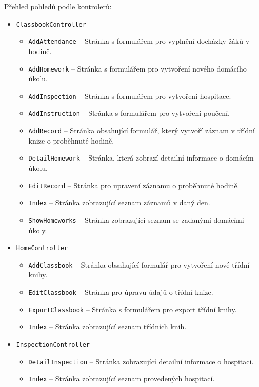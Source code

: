 Přehled pohledů podle kontrolerů:

\begin{itemize}
    \item \texttt{ClassbookController}
    \begin{itemize}
         \item \texttt{AddAttendance} -- Stránka s formulářem pro vyplnění docházky žáků v hodině.
         \item \texttt{AddHomework} -- Stránka s formulářem pro vytvoření nového domácího úkolu.
         \item \texttt{AddInspection} -- Stránka s formulářem pro vytvoření hospitace.
         \item \texttt{AddInstruction} -- Stránka s formulářem pro vytvoření poučení.
         \item \texttt{AddRecord} -- Stránka obsahující formulář, který vytvoří záznam v třídní knize o proběhnuté hodině.
         \item \texttt{DetailHomework} -- Stránka, která zobrazí detailní informace o domácím úkolu.
         \item \texttt{EditRecord} -- Stránka pro upravení záznamu o proběhnuté hodině.
         \item \texttt{Index} -- Stránka zobrazující seznam záznamů v daný den.
         \item \texttt{ShowHomeworks} -- Stránka zobrazující seznam se zadanými domácími úkoly.
    \end{itemize}
    
    \item \texttt{HomeController}
    \begin{itemize}
        \item \texttt{AddClassbook} -- Stránka obsahující formulář pro vytvoření nové třídní knihy.
        \item \texttt{EditClassbook} -- Stránka pro úpravu údajů o třídní knize.
        \item \texttt{ExportClassbook} -- Stránka s formulářem pro export třídní knihy.
        \item \texttt{Index} -- Stránka zobrazující seznam třídních knih.
    \end{itemize}
    
    \item \texttt{InspectionController}
    \begin{itemize}
        \item \texttt{DetailInspection} -- Stránka zobrazující detailní informace o ho\-spitaci.
        \item \texttt{Index} -- Stránka zobrazující seznam provedených hospitací.
    \end{itemize}
    

\end{itemize}
